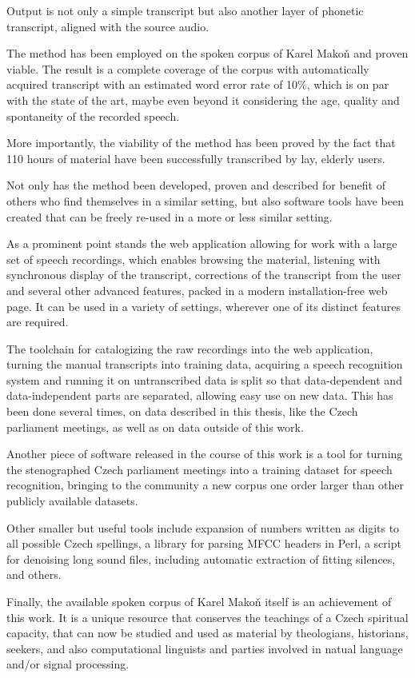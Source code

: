 \documentclass[hidelinks,12pt,a4paper]{report}
\begin{document}
Output is not only a simple transcript but also another layer of phonetic
transcript, aligned with the source audio.

The method has been employed on the spoken corpus of Karel Makoň and proven
viable. The result is a complete coverage of the corpus with automatically
acquired transcript with an estimated word error rate of 10\%, which is on par
with the state of the art, maybe even beyond it considering the age, quality and spontaneity of the
recorded speech.

More importantly, the viability of the method has been proved by the fact that
110 hours of material have been successfully transcribed by lay, elderly users.

Not only has the method been developed, proven and described for benefit of
others who find themselves in a similar setting, but also software tools have
been created that can be freely re-used in a more or less similar setting.

As a
prominent point stands the web application allowing for work with a large set of
speech recordings, which enables browsing the material, listening with
synchronous display of the transcript, corrections of the transcript from the
user and several other advanced features, packed in a modern installation-free
web page.
It can be used in a variety of settings, wherever one of its distinct features
are required.

The toolchain for catalogizing the raw recordings into the web application,
turning the manual transcripts into training data, acquiring a speech
recognition system and running it on untranscribed data is split so
that data-dependent and data-independent parts are separated, allowing easy use
on new data. This has been done several times, on data described in this thesis,
like the Czech parliament meetings, as well as on data outside of this work.

Another piece of software released in the course of this work is a tool for
turning the stenographed Czech parliament meetings into a training dataset for
speech recognition, bringing to the community a new corpus one order larger than other publicly
available datasets.

Other smaller but useful tools include expansion of numbers written as digits to
all possible Czech spellings, a library for parsing MFCC headers in Perl, a
script for denoising long sound files, including automatic extraction of
fitting silences, and others.

Finally, the available spoken corpus of Karel Makoň itself is an achievement of
this work. It is a unique resource that conserves the teachings of a Czech
spiritual capacity, that can now be studied and used as material by theologians,
historians, seekers, and also computational linguists and parties involved in
natual language and/or signal processing.
\end{document}
